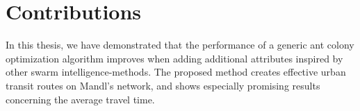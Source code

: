 \section{Contributions}


In this thesis, we have demonstrated that the performance of a generic ant colony optimization algorithm improves when adding additional attributes inspired by other swarm intelligence-methods. The proposed method creates effective urban transit routes on Mandl's network\citep{mandl79}, and shows especially promising results concerning the average travel time. 